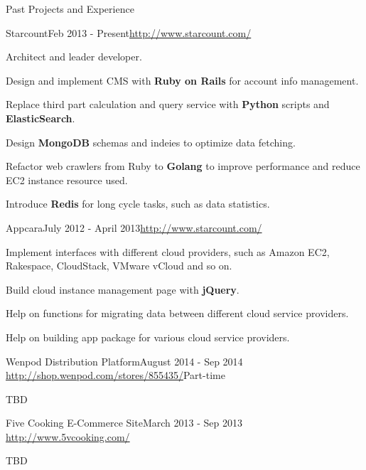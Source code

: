 \documentclass{resume} %
\newcommand{\http}{http:/\hspace{-0.3ex}/}
\begin{document}
\begin{rSection}{Past Projects and Experience}

\begin{rSubsection}{Starcount}{Feb 2013 - Present}{\href{http://www.starcount.com/}{\http{}www.starcount.com/}}{}
\item Architect and leader developer.
\item Design and implement CMS with \textbf{Ruby on Rails} for account info management.
\item Replace third part calculation and query service with \textbf{Python} scripts and \textbf{ElasticSearch}.
\item Design \textbf{MongoDB} schemas and indeies to optimize data fetching.
\item Refactor web crawlers from Ruby to \textbf{Golang} to improve performance and reduce EC2 instance resource used.
\item Introduce \textbf{Redis} for long cycle tasks, such as data statistics.
\end{rSubsection}

\begin{rSubsection}{Appcara}{July 2012 - April 2013}{\href{http://www.starcount.com/}{\http{}www.starcount.com/}}{}
\item Implement interfaces with different cloud providers, such as Amazon EC2, Rakespace, CloudStack, VMware vCloud and so on.
\item Build cloud instance management page with \textbf{jQuery}.
\item Help on functions for migrating data between different cloud service providers.
\item Help on building app package for various cloud service providers.
\end{rSubsection}

\begin{rSubsection}{Wenpod Distribution Platform}{August 2014 - Sep 2014}%
	{\href{http://$$shop.wenpod.com/stores/855435/}{\http{}shop.wenpod.com/stores/855435/}}{Part-time}
\item TBD
\end{rSubsection}

\begin{rSubsection}{Five Cooking E-Commerce Site}{March 2013 - Sep 2013}%
	{\href{http://www.5vcooking.com/}{\http{}www.5vcooking.com/}}{}
\item TBD
\end{rSubsection}

\end{rSection}
\end{document}
